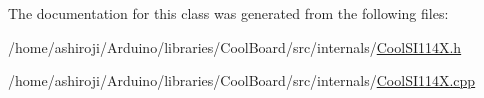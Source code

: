 The documentation for this class was generated from the following files\+:\begin{DoxyCompactItemize}
\item 
/home/ashiroji/\+Arduino/libraries/\+Cool\+Board/src/internals/\hyperlink{_cool_s_i114_x_8h}{Cool\+S\+I114\+X.\+h}\item 
/home/ashiroji/\+Arduino/libraries/\+Cool\+Board/src/internals/\hyperlink{_cool_s_i114_x_8cpp}{Cool\+S\+I114\+X.\+cpp}\end{DoxyCompactItemize}
